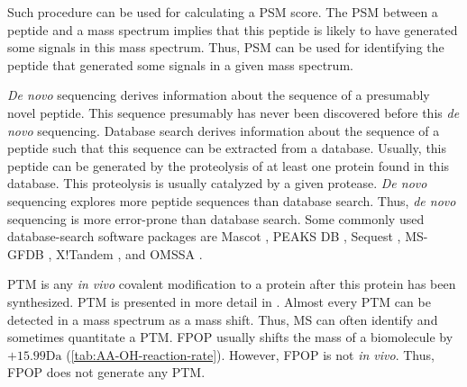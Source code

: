 Such procedure can be used for calculating a \gls{PSM} score.
The \gls{PSM} between a peptide and a mass spectrum implies that this peptide is likely to have generated some signals in this mass spectrum.
Thus, \Gls{PSM} can be used for identifying the peptide that generated some signals in a given mass spectrum.


\textit{De novo} sequencing derives information about the sequence of a presumably novel peptide. 
This sequence presumably has never been discovered before this \textit{de novo} sequencing.
Database search derives information about the sequence of a peptide such that this sequence can be extracted from a database. %
Usually, this peptide can be generated by the proteolysis of at least one protein found in this database.
This proteolysis is usually catalyzed by a given protease.
\textit{De novo} sequencing explores more peptide sequences than database search.
Thus, \textit{de novo} sequencing is more error-prone than database search. 
Some commonly used database-search software packages are 
	Mascot \cite{cottrell1999probability}, 
	PEAKS DB \cite{zhang2012peaks}, 
	Sequest \cite{eng1994approach}, 
	MS-GFDB \cite{kim2010generating}, 
	X!Tandem \cite{craig2004tandem}, 
	and OMSSA \cite{geer2004open}.

\Gls{PTM} is any \textit{in vivo} covalent modification to a protein after this protein has been synthesized. 
\Gls{PTM} is presented in more detail in \cite[Chapter~20]{naik2012essentials}. %
Almost every \gls{PTM} can be detected in a mass spectrum as a mass shift.
Thus, \gls{MS} can often identify and sometimes quantitate a \gls{PTM}.
\Gls{FPOP} usually shifts the mass of a biomolecule by \(+15.99\si{\dalton}\) (\cref{tab:AA-OH-reaction-rate}).
However, \gls{FPOP} is not \textit{in vivo}.
Thus, \gls{FPOP} does not generate any \gls{PTM}.

